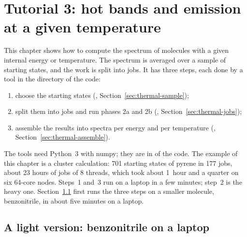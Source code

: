 \chapter{Tutorial 3: hot bands and emission at a given temperature}\label{ch:tut-thermal}

This chapter shows how to compute the spectrum of molecules with a given
internal energy or temperature. The spectrum is averaged over a sample of
starting states, and the work is split into jobs. It has three steps, each
done by a tool in the  directory of the code:
\begin{enumerate}
\item choose the starting states (,
Section~\ref{sec:thermal-sample});
\item split them into jobs and run phases 2a and 2b (,
Section~\ref{sec:thermal-jobs});
\item assemble the results into spectra per energy and per temperature
(, Section~\ref{sec:thermal-assemble}).
\end{enumerate}
The tools need Python~3 with numpy; they are in  of the code.
The example of this chapter is a cluster calculation: 701 starting states
of pyrene in 177 jobs, about 23 hours of jobs of 8 threads, which took
about 1~hour and a quarter on six 64-core nodes. Steps~1 and~3 run on a
laptop in a few minutes; step~2 is the heavy one.
Section~\ref{sec:thermal-light} first runs the three steps on a smaller
molecule, benzonitrile, in about five minutes on a laptop.

\section{A light version: benzonitrile on a laptop}\label{sec:thermal-light}

